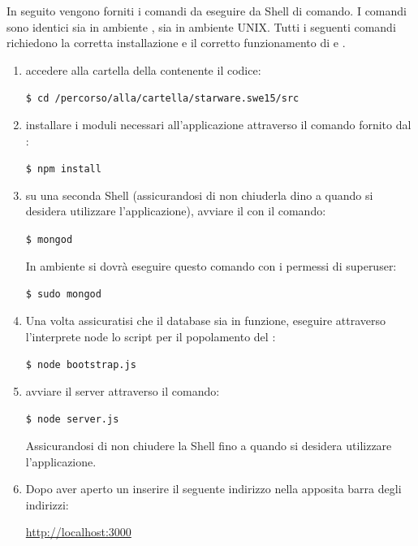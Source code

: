 \documentclass[12pt,a4paper]{article}
\begin{document}
	In seguito vengono forniti i comandi da eseguire da Shell di comando. I comandi sono identici sia in ambiente , sia in ambiente UNIX.
	Tutti i seguenti comandi richiedono la corretta installazione e il corretto funzionamento di  e .
	\begin{enumerate}
		\item accedere alla cartella della  contenente il codice:
		\begin{center}
			\texttt{\$ cd /percorso/alla/cartella/starware.swe15/src} 
		\end{center}
		\item installare i moduli  necessari all'applicazione attraverso il comando fornito dal :
		\begin{center}
			\texttt{\$ npm install} 
		\end{center}
		\item su una seconda Shell (assicurandosi di non chiuderla dino a quando si desidera utilizzare l'applicazione), avviare il   con il comando:
		\begin{center}
			\texttt{\$ mongod} 	
		\end{center}	
		In ambiente  si dovrà eseguire questo comando con i permessi di superuser:
		\begin{center}
			\texttt{\$ sudo mongod} 	
		\end{center}
		\item Una volta assicuratisi che il database sia in funzione, eseguire attraverso l'interprete node lo script per il popolamento del :
		\begin{center}
			\texttt{\$ node bootstrap.js} 	
		\end{center} 
		\item avviare il server  attraverso il comando:
		\begin{center}
			\texttt{\$ node server.js} 	
		\end{center} 
		Assicurandosi di non chiudere la Shell fino a quando si desidera utilizzare l'applicazione.
		\item Dopo aver aperto un  inserire il seguente indirizzo nella apposita barra degli indirizzi:
		\begin{center}
			\url{http://localhost:3000}
		\end{center}
			
	\end{enumerate}
		
\end{document}
